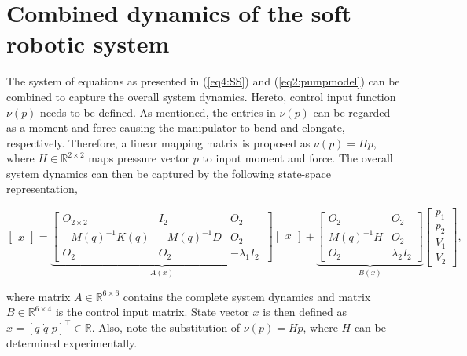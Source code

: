 {\section{Combined dynamics of the soft robotic system}




The system of equations as presented in (\ref{eq4:SS}) and (\ref{eq2:pumpmodel}) can be combined to capture the overall system dynamics. Hereto, control input function $\nu(p)$ needs to be defined. As mentioned, the entries in $\nu(p)$ can be regarded as a moment and force causing the manipulator to bend and elongate, respectively. Therefore, a linear mapping matrix is proposed as $\nu(p) = H p$, where $H \in \mathbb{R}^{2\times 2}$ maps pressure vector $p$ to input moment and force. The overall system dynamics can then be captured by the following state-space representation,

\begin{equation}
     \begin{bmatrix} \dot{x}  \end{bmatrix}   =   \underbrace{ \begin{bmatrix} O_{2\times 2} & I_{2} & O_{2} \\ -M(q)^{-1}K(q)  & -M(q)^{-1} D & O_{2} \\
     O_{2} & O_{2}    & -\lambda_1 I_{2}\ \end{bmatrix}   }_{A(x)}   \begin{bmatrix} x \end{bmatrix}  + \underbrace{      \begin{bmatrix} O_{2} & O_{2} \\ M(q)^{-1}H & O_{2} \\ O_{2} & \lambda_2 I_{2} \end{bmatrix} }_{B(x)}      \begin{bmatrix} p_1 \\ p_2  \\ V_1 \\ V_2 \end{bmatrix},
     \label{eq:ssp}
\end{equation}

where matrix $A \in \mathbb{R}^{6\times 6}$ contains the complete system dynamics and matrix $B \in \mathbb{R}^{6\times 4}$ is the control input matrix. State vector $x$ is then defined as $x = [q \hspace{4pt} \dot{q} \hspace{4pt} p]^\top \in \mathbb{R}$. Also, note the substitution of $\nu(p) = Hp$, where $H$ can be determined experimentally. 



}
